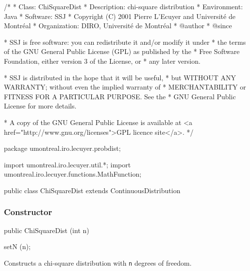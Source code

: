 \begin{code}
\begin{hide}
/*
 * Class:        ChiSquareDist
 * Description:  chi-square distribution
 * Environment:  Java
 * Software:     SSJ 
 * Copyright (C) 2001  Pierre L'Ecuyer and Université de Montréal
 * Organization: DIRO, Université de Montréal
 * @author       
 * @since

 * SSJ is free software: you can redistribute it and/or modify it under
 * the terms of the GNU General Public License (GPL) as published by the
 * Free Software Foundation, either version 3 of the License, or
 * any later version.

 * SSJ is distributed in the hope that it will be useful,
 * but WITHOUT ANY WARRANTY; without even the implied warranty of
 * MERCHANTABILITY or FITNESS FOR A PARTICULAR PURPOSE.  See the
 * GNU General Public License for more details.

 * A copy of the GNU General Public License is available at
   <a href="http://www.gnu.org/licenses">GPL licence site</a>.
 */
\end{hide}
package umontreal.iro.lecuyer.probdist;
\begin{hide}
import umontreal.iro.lecuyer.util.*;
import umontreal.iro.lecuyer.functions.MathFunction;
\end{hide}

public class ChiSquareDist extends ContinuousDistribution\begin{hide} {
   protected int n;
   protected double C1;

   private static class Function implements MathFunction {
      protected int n;
      protected double sumLog;

      public Function (double s, int n)
      {
         this.n = n;
         this.sumLog = s;
      }

      public double evaluate (double k)
      {
         if (k < 1.0) return 1.0e200;
         return (sumLog + n * (Num.lnGamma (k / 2.0) - 0.5*Num.LN2 - Num.lnGamma ((k + 1.0) / 2.0)));
      }
   }
\end{hide}
\end{code}
\subsubsection* {Constructor}

\begin{code}

   public ChiSquareDist (int n)\begin{hide} {
      setN (n);
   }\end{hide}
\end{code}
\begin{tabb}
   Constructs a chi-square distribution with \texttt{n} degrees of freedom.
\end{tabb}

